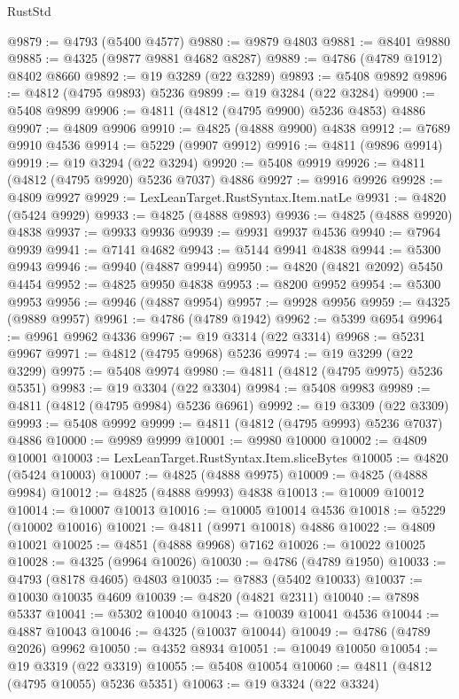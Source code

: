 \begin{lexlean}{RustStd}
\begin{coremodule}
@9879 := @4793 (@5400 @4577)
@9880 := @9879 @4803
@9881 := @8401 @9880
@9885 := @4325 (@9877 @9881 @4682 @8287)
@9889 := @4786 (@4789 @1912) @8402 @8660
@9892 := @19 @3289 (@22 @3289)
@9893 := @5408 @9892
@9896 := @4812 (@4795 @9893) @5236
@9899 := @19 @3284 (@22 @3284)
@9900 := @5408 @9899
@9906 := @4811 (@4812 (@4795 @9900) @5236 @4853) @4886
@9907 := @4809 @9906
@9910 := @4825 (@4888 @9900) @4838
@9912 := @7689 @9910 @4536
@9914 := @5229 (@9907 @9912)
@9916 := @4811 (@9896 @9914)
@9919 := @19 @3294 (@22 @3294)
@9920 := @5408 @9919
@9926 := @4811 (@4812 (@4795 @9920) @5236 @7037) @4886
@9927 := @9916 @9926
@9928 := @4809 @9927
@9929 := LexLeanTarget.RustSyntax.Item.natLe
@9931 := @4820 (@5424 @9929)
@9933 := @4825 (@4888 @9893)
@9936 := @4825 (@4888 @9920) @4838
@9937 := @9933 @9936
@9939 := @9931 @9937 @4536
@9940 := @7964 @9939
@9941 := @7141 @4682
@9943 := @5144 @9941 @4838
@9944 := @5300 @9943
@9946 := @9940 (@4887 @9944)
@9950 := @4820 (@4821 @2092) @5450 @4454
@9952 := @4825 @9950 @4838
@9953 := @8200 @9952
@9954 := @5300 @9953
@9956 := @9946 (@4887 @9954)
@9957 := @9928 @9956
@9959 := @4325 (@9889 @9957)
@9961 := @4786 (@4789 @1942)
@9962 := @5399 @6954
@9964 := @9961 @9962 @4336
@9967 := @19 @3314 (@22 @3314)
@9968 := @5231 @9967
@9971 := @4812 (@4795 @9968) @5236
@9974 := @19 @3299 (@22 @3299)
@9975 := @5408 @9974
@9980 := @4811 (@4812 (@4795 @9975) @5236 @5351)
@9983 := @19 @3304 (@22 @3304)
@9984 := @5408 @9983
@9989 := @4811 (@4812 (@4795 @9984) @5236 @6961)
@9992 := @19 @3309 (@22 @3309)
@9993 := @5408 @9992
@9999 := @4811 (@4812 (@4795 @9993) @5236 @7037) @4886
@10000 := @9989 @9999
@10001 := @9980 @10000
@10002 := @4809 @10001
@10003 := LexLeanTarget.RustSyntax.Item.sliceBytes
@10005 := @4820 (@5424 @10003)
@10007 := @4825 (@4888 @9975)
@10009 := @4825 (@4888 @9984)
@10012 := @4825 (@4888 @9993) @4838
@10013 := @10009 @10012
@10014 := @10007 @10013
@10016 := @10005 @10014 @4536
@10018 := @5229 (@10002 @10016)
@10021 := @4811 (@9971 @10018) @4886
@10022 := @4809 @10021
@10025 := @4851 (@4888 @9968) @7162
@10026 := @10022 @10025
@10028 := @4325 (@9964 @10026)
@10030 := @4786 (@4789 @1950)
@10033 := @4793 (@8178 @4605) @4803
@10035 := @7883 (@5402 @10033)
@10037 := @10030 @10035 @4609
@10039 := @4820 (@4821 @2311)
@10040 := @7898 @5337
@10041 := @5302 @10040
@10043 := @10039 @10041 @4536
@10044 := @4887 @10043
@10046 := @4325 (@10037 @10044)
@10049 := @4786 (@4789 @2026) @9962
@10050 := @4352 @8934
@10051 := @10049 @10050
@10054 := @19 @3319 (@22 @3319)
@10055 := @5408 @10054
@10060 := @4811 (@4812 (@4795 @10055) @5236 @5351)
@10063 := @19 @3324 (@22 @3324)

\end{coremodule}
\end{lexlean}
